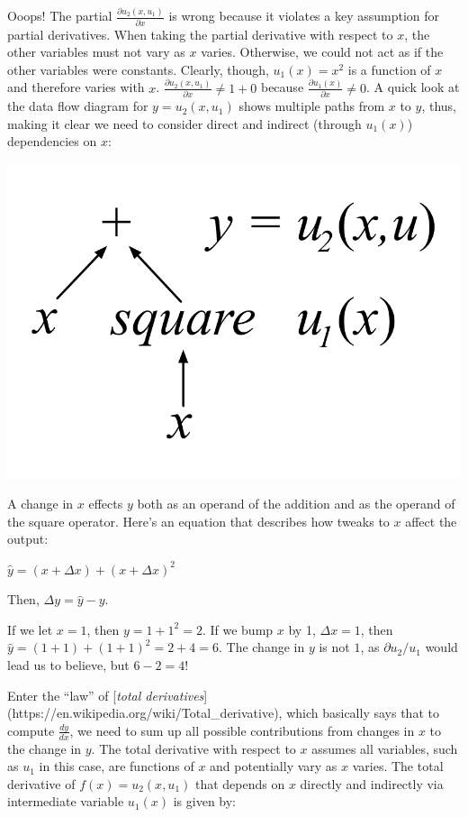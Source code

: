 \documentclass[11pt]{article}
\begin{document}
Ooops! The partial $\frac{\partial u_2(x,u_1)}{\partial x}$ is wrong because it violates a key assumption for partial derivatives. When taking the partial derivative with respect to $x$, the other variables must not vary as $x$ varies. Otherwise, we could not act as if the other variables were constants. Clearly, though, $u_1(x)=x^2$ is a function of $x$ and therefore varies with $x$. $\frac{\partial u_2(x,u_1)}{\partial x} \neq 1 + 0$ because $\frac{\partial u_1(x)}{\partial x} \neq 0$. A quick look at the data flow diagram for $y=u_2(x,u_1)$ shows multiple paths from $x$ to $y$, thus, making it clear we need to consider direct and indirect (through $u_1(x)$) dependencies on $x$:

\includegraphics[scale=.9]{plus-square.png}

A change in $x$ effects $y$ both as an operand of the addition and as the operand of the square operator. Here's an equation that describes how tweaks to $x$ affect the output:

$\hat y = (x + \Delta x) + (x + \Delta x)^2$

Then, $\Delta y = \hat y - y$.

If we let $x=1$, then $y=1+1^2=2$. If we bump $x$ by 1, $\Delta x=1$, then $\hat y = (1+1) + (1+1)^2 = 2 + 4 = 6$. The change in $y$ is not $1$, as $\partial u_2 / u_1$ would lead us to believe, but $6-2 = 4$!

Enter the ``law'' of [{\em total derivatives}](https://en.wikipedia.org/wiki/Total\_derivative), which basically says that to compute $\frac{dy}{dx}$, we need to sum up all possible contributions from changes in $x$ to the change in $y$. The total derivative with respect to $x$ assumes all variables, such as $u_1$ in this case, are functions of $x$ and potentially vary as $x$ varies.   The total derivative of $f(x) = u_2(x,u_1)$ that depends on $x$ directly and indirectly via intermediate variable $u_1(x)$ is given by:
\end{document}
